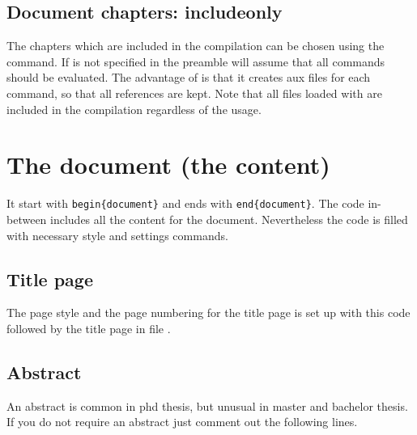 \subsection{Document chapters: includeonly}
\label{sec:preamble:includeonly}
The chapters which are included in the compilation can be chosen using the  command. If  is not specified in the preamble \latex will assume that all  commands should be evaluated. The advantage of  is that it creates aux files for each  command, so that all references are kept. Note that all files loaded with  are included in the compilation regardless of the  usage.


\section{The document (the content)}
\label{sec:doc:document}
It start with \texttt{\bs{}begin\{document\}} and ends with \texttt{\bs{}end\{document\}}.
The code in-between includes all the content for the document. Nevertheless the code is filled with necessary style and settings commands.

\subsection{Title page}
\label{sec:document:title}
The page style and the page numbering for the title page is set up with this code
%
followed by the title page in file .

\subsection{Abstract}
\label{sec:document:abstract}

An abstract is common in phd thesis, but unusual in master and bachelor thesis. If you do not require an abstract just comment out the following lines.

